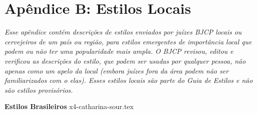 \clearpage
{}
\divisorLine
\section*{Apêndice B: Estilos Locais}

\textit{Esse apêndice contém descrições de estilos enviados por juízes BJCP locais ou cervejeiros de um país ou região, para estilos emergentes de importância local que podem ou não ter uma popularidade mais ampla. O BJCP revisou, editou e verificou as descrições do estilo, que podem ser usadas por qualquer pessoa, não apenas como um apelo da local (embora juízes fora da área podem não ser familiarizados com o elas). Esses estilos locais são parte do Guia de Estilos e não são estilos provisórios.}

\begin{multicols}{2}

  \textbf{\Large\color{blue}
  Estilos Brasileiros
  }
  {x4-catharina-sour.tex}

\end{multicols}